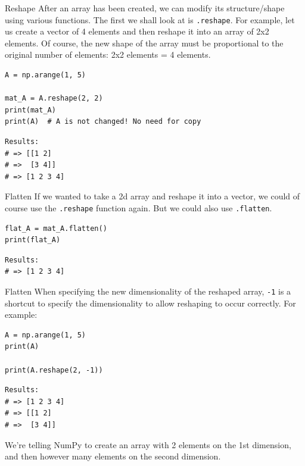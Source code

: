 \documentclass[10pt]{beamer}
\begin{document}
\begin{frame}[label={sec:orga5dff20},fragile]{Reshape}
 After an array has been created, we can modify its structure/shape using various
functions. The first we shall look at is \texttt{.reshape}. For example, let us create a
vector of 4 elements and then reshape it into an array of 2x2 elements. Of course,
the new shape of the array must be proportional to the original number of elements:
2x2 elements = 4 elements.

\begin{verbatim}
A = np.arange(1, 5)

mat_A = A.reshape(2, 2)
print(mat_A)
print(A)  # A is not changed! No need for copy
\end{verbatim}

\begin{verbatim}
Results: 
# => [[1 2]
# =>  [3 4]]
# => [1 2 3 4]
\end{verbatim}
\end{frame}

\begin{frame}[label={sec:orgacf11a3},fragile]{Flatten}
 If we wanted to take a 2d array and reshape it into a vector, we could of course use
the \texttt{.reshape} function again. But we could also use \texttt{.flatten}.

\begin{verbatim}
flat_A = mat_A.flatten()
print(flat_A)
\end{verbatim}

\begin{verbatim}
Results: 
# => [1 2 3 4]
\end{verbatim}
\end{frame}

\begin{frame}[label={sec:org49d203e},fragile]{Flatten}
 When specifying the new dimensionality of the reshaped array, \texttt{-1} is a shortcut to
specify the dimensionality to allow reshaping to occur correctly. For example:

\begin{verbatim}
A = np.arange(1, 5)
print(A)

print(A.reshape(2, -1))
\end{verbatim}

\begin{verbatim}
Results: 
# => [1 2 3 4]
# => [[1 2]
# =>  [3 4]]
\end{verbatim}


We're telling NumPy to create an array with 2 elements on the 1st dimension, and then
however many elements on the second dimension.
\end{frame}
\end{document}
